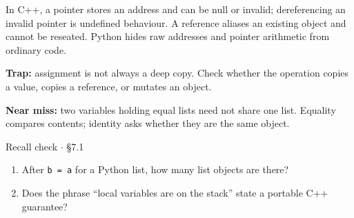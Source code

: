 \documentclass[11pt]{article}
\begin{document}
\begin{keepsection}
In C++, a pointer stores an address and can be null or invalid; dereferencing an invalid pointer is undefined behaviour. A reference aliases an existing object and cannot be reseated. Python hides raw addresses and pointer arithmetic from ordinary code.

\begin{notebox}\textbf{Trap:} assignment is not always a deep copy. Check whether the operation copies a value, copies a reference, or mutates an object.\end{notebox}

\begin{notebox}\textbf{Near miss:} two variables holding equal lists need not share one list. Equality compares contents; identity asks whether they are the same object.\end{notebox}

\begin{recallbox}{Recall check \ensuremath{\cdot} §7.1}
\begin{enumerate}
\item After \texttt{b = a} for a Python list, how many list objects are there?
\item Does the phrase “local variables are on the stack” state a portable C++ guarantee?
\end{enumerate}

\end{recallbox}
\end{keepsection}
\end{document}
